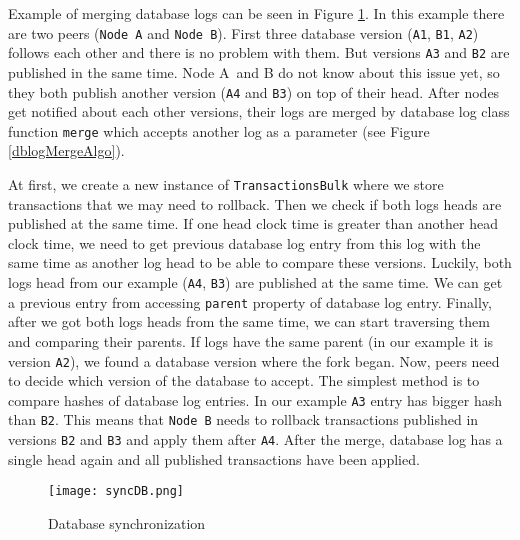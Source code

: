Example of merging database logs can be seen in Figure \ref{syncDB}. In this example there are two peers (\texttt{Node A} and \texttt{Node B}). First three database version (\texttt{A1}, \texttt{B1}, \texttt{A2}) follows each other and there is no problem with them. But versions \texttt{A3} and \texttt{B2} are published in the same time. Node A~and B do not know about this issue yet, so they both publish another version (\texttt{A4} and \texttt{B3}) on top of their head. After nodes get notified about each other versions, their logs are merged by database log class function \texttt{merge} which accepts another log as a parameter (see Figure \ref{dblogMergeAlgo}). 

At first, we create a new instance of \texttt{TransactionsBulk} where we store transactions that we may need to rollback. Then we check if both logs heads are published at the same time. If one head clock time is greater than another head clock time, we need to get previous database log entry from this log with the same time as another log head to be able to compare these versions. Luckily, both logs head from our example (\texttt{A4}, \texttt{B3}) are published at the same time. We can get a previous entry from accessing \texttt{parent} property of database log entry. Finally, after we got both logs heads from the same time, we can start traversing them and comparing their parents. If logs have the same parent (in our example it is version \texttt{A2}), we found a database version where the fork began. Now, peers need to decide which version of the database to accept. The simplest method is to compare hashes of database log entries. In our example \texttt{A3} entry has bigger hash than \texttt{B2}. This means that \texttt{Node B} needs to rollback transactions published in versions \texttt{B2} and \texttt{B3} and apply them after \texttt{A4}. After the merge, database log has a single head again and all published transactions have been applied.

\begin{figure}[h]
    \centering
    \texttt{[image: syncDB.png]}
    \caption{Database synchronization}
    \label{syncDB}
\end{figure}

